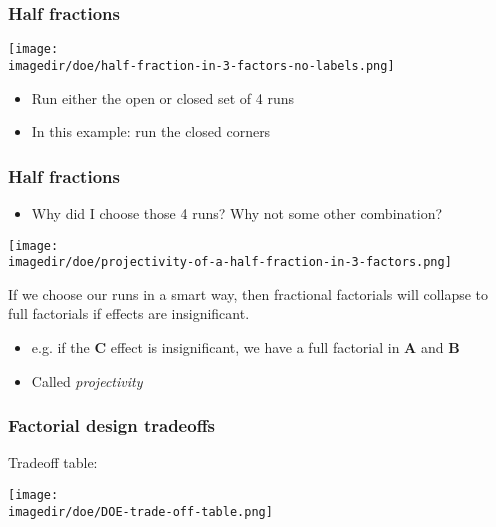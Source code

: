 \begin{frame}\frametitle{Half fractions}
	\begin{center}
		\texttt{[image: \\imagedir/doe/half-fraction-in-3-factors-no-labels.png]}
	\end{center}
	\begin{itemize}
		\item	Run either the open or closed set of 4 runs
		\item	In this example: run the closed corners
	\end{itemize}
\end{frame}

\begin{frame}\frametitle{Half fractions}
	\begin{itemize}
		\item	Why did I choose those 4 runs? Why not some other combination?
	\end{itemize}
	\begin{center}
		\texttt{[image: \\imagedir/doe/projectivity-of-a-half-fraction-in-3-factors.png]}
	\end{center}
	If we choose our runs in a smart way, then fractional factorials will collapse to full factorials if effects are insignificant.
	\begin{itemize}
		\item	e.g. if the \textbf{C} effect is insignificant, we have a full factorial in \textbf{A} and \textbf{B}
		\item	Called \emph{projectivity}
	\end{itemize}
\end{frame}

\begin{frame}\frametitle{Factorial design tradeoffs}

	Tradeoff table:
	\begin{center}
		\texttt{[image: \\imagedir/doe/DOE-trade-off-table.png]}
	\end{center}
\end{frame}

